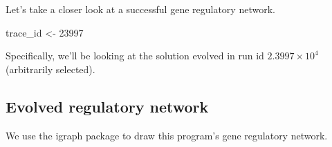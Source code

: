 \documentclass[
]{book}
\newenvironment{Shaded}{\begin{snugshade}}{\end{snugshade}}
\newcommand{\DecValTok}[1]{\textcolor[rgb]{0.00,0.00,0.81}{#1}}
\newcommand{\NormalTok}[1]{#1}
\newcommand{\OtherTok}[1]{\textcolor[rgb]{0.56,0.35,0.01}{#1}}
\begin{document}
Let's take a closer look at a successful gene regulatory network.

\begin{Shaded}
\begin{Highlighting}[]
\NormalTok{trace\_id }\OtherTok{\textless{}{-}} \DecValTok{23997}
\end{Highlighting}
\end{Shaded}

Specifically, we'll be looking at the solution evolved in run id \ensuremath{2.3997\times 10^{4}} (arbitrarily selected).

\hypertarget{evolved-regulatory-network-1}{%
\subsection{Evolved regulatory network}\label{evolved-regulatory-network-1}}

We use the igraph package to draw this program's gene regulatory network.
\end{document}
